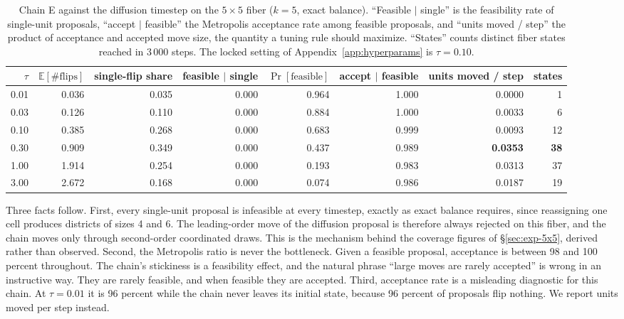 \documentclass[11pt]{article}
\newcommand{\E}{\mathbb{E}}
\begin{document}
\begin{table}[H]
\centering
\small
\begin{tabular}{rrrrrrrr}
\toprule
$\tau$ & $\E[\#\mathrm{flips}]$ & single-flip share & feasible $\mid$ single
  & $\Pr[\text{feasible}]$ & accept $\mid$ feasible & units moved / step & states \\
\midrule
0.01 & 0.036 & 0.035 & 0.000 & 0.964 & 1.000 & 0.0000 & 1 \\
0.03 & 0.126 & 0.110 & 0.000 & 0.884 & 1.000 & 0.0033 & 6 \\
0.10 & 0.385 & 0.268 & 0.000 & 0.683 & 0.999 & 0.0093 & 12 \\
0.30 & 0.909 & 0.349 & 0.000 & 0.437 & 0.989 & \textbf{0.0353} & \textbf{38} \\
1.00 & 1.914 & 0.254 & 0.000 & 0.193 & 0.983 & 0.0313 & 37 \\
3.00 & 2.672 & 0.168 & 0.000 & 0.074 & 0.986 & 0.0187 & 19 \\
\bottomrule
\end{tabular}
\caption{Chain E against the diffusion timestep on the $5 \times 5$
  fiber ($k = 5$, exact balance). ``Feasible $\mid$ single'' is the
  feasibility rate of single-unit proposals, ``accept $\mid$
  feasible'' the Metropolis acceptance rate among feasible
  proposals, and ``units moved / step'' the product of acceptance and
  accepted move size, the quantity a tuning rule should maximize.
  ``States'' counts distinct fiber states reached in 3\,000 steps.
  The locked setting of Appendix~\ref{app:hyperparams} is
  $\tau = 0.10$.}\label{tab:mobility}
\end{table}

Three facts follow. First, every single-unit proposal is infeasible at
every timestep, exactly as exact balance requires, since reassigning
one cell produces districts of sizes 4 and 6. The leading-order move
of the diffusion proposal is therefore always rejected on this fiber,
and the chain moves only through second-order coordinated draws. This
is the mechanism behind the coverage figures of \S\ref{sec:exp-5x5},
derived rather than observed. Second, the Metropolis ratio is never
the bottleneck. Given a feasible proposal, acceptance is between 98
and 100 percent throughout. The chain's stickiness is a feasibility
effect, and the natural phrase ``large moves are rarely accepted'' is
wrong in an instructive way. They are rarely feasible, and when
feasible they are accepted. Third, acceptance rate is a misleading
diagnostic for this chain. At $\tau = 0.01$ it is 96 percent while
the chain never leaves its initial state, because 96 percent of
proposals flip nothing. We report units moved per step instead.
\end{document}
